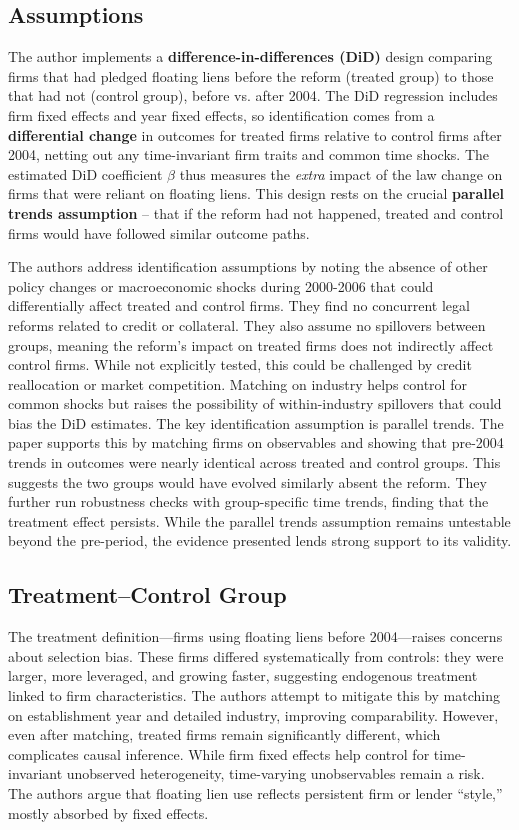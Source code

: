 \subsection{Assumptions}

The author implements a \textbf{difference-in-differences (DiD)} design comparing firms that had pledged floating liens before the reform (treated group) to those that had not (control group), before vs. after 2004. The DiD regression includes firm fixed effects and year fixed effects, so identification comes from a \textbf{differential change} in outcomes for treated firms relative to control firms after 2004, netting out any time-invariant firm traits and common time shocks. The estimated DiD coefficient $\beta$ thus measures the \textit{extra} impact of the law change on firms that were reliant on floating liens. This design rests on the crucial \textbf{parallel trends assumption} -- that if the reform had not happened, treated and control firms would have followed similar outcome paths. 

The authors address identification assumptions by noting the absence of other policy changes or macroeconomic shocks during 2000-2006 that could differentially affect treated and control firms. They find no concurrent legal reforms related to credit or collateral. They also assume no spillovers between groups, meaning the reform's impact on treated firms does not indirectly affect control firms. While not explicitly tested, this could be challenged by credit reallocation or market competition. Matching on industry helps control for common shocks but raises the possibility of within-industry spillovers that could bias the DiD estimates. The key identification assumption is parallel trends. The paper supports this by matching firms on observables and showing that pre-2004 trends in outcomes were nearly identical across treated and control groups. This suggests the two groups would have evolved similarly absent the reform. They further run robustness checks with group-specific time trends, finding that the treatment effect persists. While the parallel trends assumption remains untestable beyond the pre-period, the evidence presented lends strong support to its validity.

\subsection{Treatment--Control Group}

The treatment definition—firms using floating liens before 2004—raises concerns about selection bias. These firms differed systematically from controls: they were larger, more leveraged, and growing faster, suggesting endogenous treatment linked to firm characteristics. The authors attempt to mitigate this by matching on establishment year and detailed industry, improving comparability. However, even after matching, treated firms remain significantly different, which complicates causal inference.
While firm fixed effects help control for time-invariant unobserved heterogeneity, time-varying unobservables remain a risk. The authors argue that floating lien use reflects persistent firm or lender “style,” mostly absorbed by fixed effects. 
